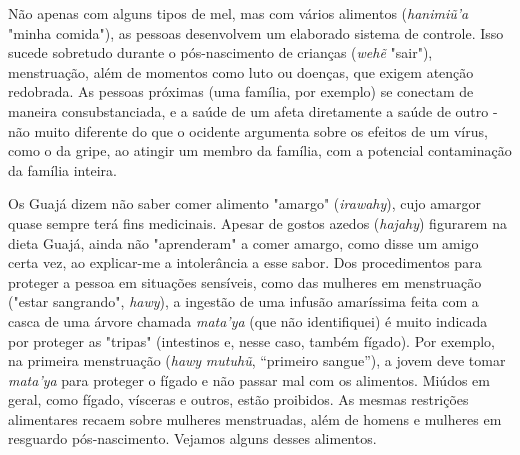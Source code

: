 Não apenas com alguns tipos de mel, mas com vários alimentos
(\emph{hanimiũ'a} "minha comida"), as pessoas desenvolvem um elaborado
sistema de controle. Isso sucede sobretudo durante o pós-nascimento de
crianças (\emph{wehẽ} "sair"), menstruação, além de momentos como luto
ou doenças, que exigem atenção redobrada. As pessoas próximas (uma
família, por exemplo) se conectam de maneira consubstanciada, e a saúde
de um afeta diretamente a saúde de outro - não muito diferente do que o
ocidente argumenta sobre os efeitos de um vírus, como o da gripe, ao
atingir um membro da família, com a potencial contaminação da família
inteira.

Os Guajá dizem não saber comer alimento "amargo" (\emph{irawahy}), cujo
amargor quase sempre terá fins medicinais. Apesar de gostos azedos
(\emph{hajahy}) figurarem na dieta Guajá, ainda não "aprenderam" a comer
amargo, como disse um amigo certa vez, ao explicar-me a intolerância a
esse sabor. Dos procedimentos para proteger a pessoa em situações
sensíveis, como das mulheres em menstruação ("estar sangrando",
\emph{hawy}), a ingestão de uma infusão amaríssima feita com a casca de
uma árvore chamada \emph{mata'ya} (que não identifiquei) é muito
indicada por proteger as "tripas" (intestinos e, nesse caso, também
fígado). Por exemplo, na primeira menstruação (\emph{hawy}
\emph{mutuhũ}, ``primeiro sangue''), a jovem deve tomar \emph{mata'ya}
para proteger o fígado e não passar mal com os alimentos. Miúdos em
geral, como fígado, vísceras e outros, estão proibidos. As mesmas
restrições alimentares recaem sobre mulheres menstruadas, além de homens
e mulheres em resguardo pós-nascimento. Vejamos alguns desses alimentos.







